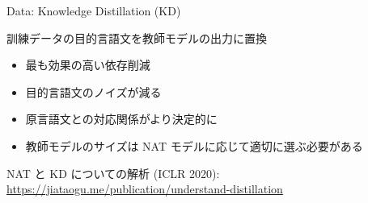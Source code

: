 \documentclass[unicode, 12pt, xdvipdfmx, aspectratio=43]{beamer}
\begin{document}
\begin{frame}[label={sec:org53115a7}]{Data: Knowledge Distillation (KD)}
\begin{block}{訓練データの目的言語文を教師モデルの出力に置換}
\begin{itemize}
\item 最も効果の高い依存削減
\item 目的言語文のノイズが減る
\item 原言語文との対応関係がより決定的に
\item 教師モデルのサイズは NAT モデルに応じて適切に選ぶ必要がある
\end{itemize}

\begin{block}{NAT と KD についての解析 (ICLR 2020):}
\scriptsize \url{https://jiataogu.me/publication/understand-distillation}
\end{block}
\end{block}
\end{frame}
\end{document}
